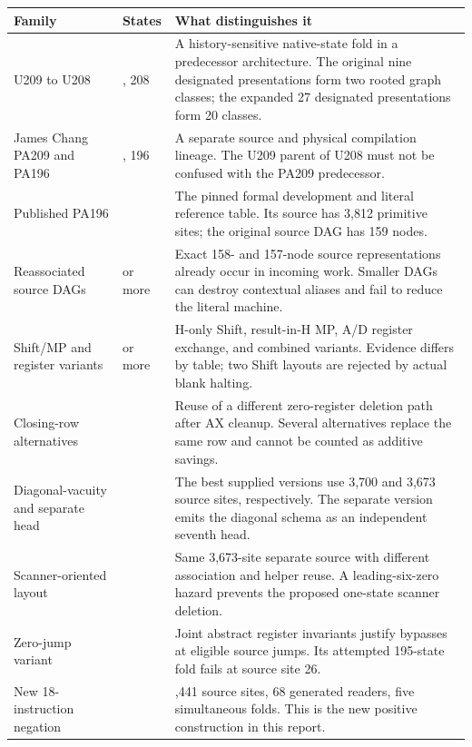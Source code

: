 \documentclass[11pt,a4paper]{article}
\begin{document}
\begin{longtable}{@{}>{\raggedright\arraybackslash}p{}>{\raggedright\arraybackslash}p{}>{\raggedright\arraybackslash}p{}@{}}
\toprule
Family & States & What distinguishes it \\
\midrule\endhead
U209 to U208 & 209, 208 & A history-sensitive native-state fold in a predecessor architecture. The original nine designated presentations form two rooted graph classes; the expanded 27 designated presentations form 20 classes. \\
James Chang PA209 and PA196 & 209, 196 & A separate source and physical compilation lineage. The U209 parent of U208 must not be confused with the PA209 predecessor. \\
Published PA196 & 196 & The pinned formal development and literal reference table. Its source has 3,812 primitive sites; the original source DAG has 159 nodes. \\
Reassociated source DAGs & 196 or more & Exact 158- and 157-node source representations already occur in incoming work. Smaller DAGs can destroy contextual aliases and fail to reduce the literal machine. \\
Shift/MP and register variants & 196 or more & H-only Shift, result-in-H MP, A/D register exchange, and combined variants. Evidence differs by table; two Shift layouts are rejected by actual blank halting. \\
Closing-row alternatives & 196 & Reuse of a different zero-register deletion path after AX cleanup. Several alternatives replace the same row and cannot be counted as additive savings. \\
Diagonal-vacuity and separate head & 196 & The best supplied versions use 3,700 and 3,673 source sites, respectively. The separate version emits the diagonal schema as an independent seventh head. \\
Scanner-oriented layout & 196 & Same 3,673-site separate source with different association and helper reuse. A leading-six-zero hazard prevents the proposed one-state scanner deletion. \\
Zero-jump variant & 196 & Joint abstract register invariants justify bypasses at eligible source jumps. Its attempted 195-state fold fails at source site 26. \\
New 18-instruction negation & 197 & 3,441 source sites, 68 generated readers, five simultaneous folds. This is the new positive construction in this report. \\
\bottomrule
\end{longtable}
\end{document}
